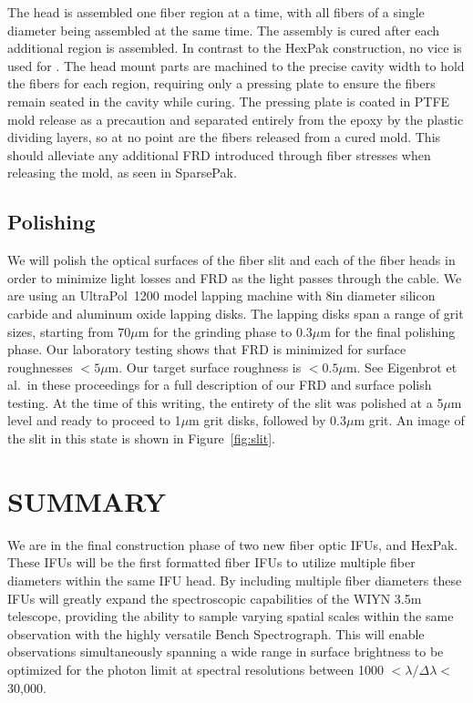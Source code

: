 The \GP head is assembled one fiber region at a time, with all fibers of a
single diameter being assembled at the same time.  The assembly is cured after
each additional region is assembled.  In contrast to the HexPak construction,
no vice is used for \GP.  The head mount parts are machined to the precise
cavity width to hold the fibers for each region, requiring only a pressing
plate to ensure the fibers remain seated in the cavity while curing.  The
pressing plate is coated in PTFE mold release as a precaution and separated
entirely from the epoxy by the plastic dividing layers, so at no point are the
fibers released from a cured mold.  This should alleviate any additional FRD
introduced through fiber stresses when releasing the mold, as seen in
SparsePak.


\subsection{Polishing}
\label{subsec:polishing}
We will polish the optical surfaces of the fiber slit and each of the fiber
heads in order to minimize light losses and FRD as the light passes through
the cable.  We are using an UltraPol\footnotemark[2]\ 1200 model lapping
machine with 8in diameter silicon carbide and aluminum oxide lapping disks.
 The lapping disks span a range of grit
sizes, starting from $70\mu$m for the grinding phase to $0.3\mu$m for the
final polishing phase.  Our laboratory testing shows that FRD is minimized for
surface roughnesses $<5\mu$m.  Our target surface roughness is $<0.5\mu$m.
See Eigenbrot et al.\ in these proceedings for a full description of our FRD
and surface polish testing.  At the time of this writing, the entirety of the
slit was polished at a 5$\mu$m level and ready to proceed to 1$\mu$m grit
disks, followed by 0.3$\mu$m grit.  An image of the slit in this state is
shown in Figure~\ref{fig:slit}.


\section{SUMMARY} 
\label{GPB:sec:conclusion}

We are in the final construction phase of two new fiber optic IFUs, \GP
and HexPak.  These IFUs will be the first formatted fiber IFUs to utilize
multiple fiber diameters within the same IFU head.  By including multiple
fiber diameters these IFUs will greatly expand the spectroscopic capabilities
of the WIYN 3.5m telescope, providing the ability to sample varying spatial
scales within the same observation with the highly versatile Bench
Spectrograph.  This will enable observations simultaneously spanning a wide
range in surface brightness to be optimized for the photon limit at spectral
resolutions between 1000 $< \lambda/\Delta\lambda <$ 30,000.


